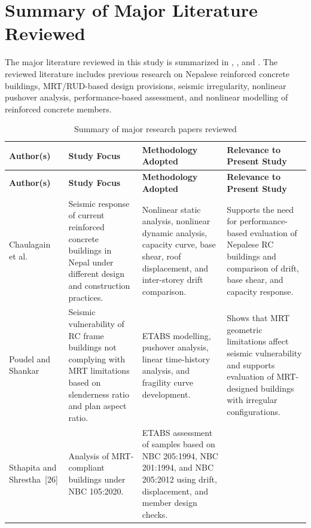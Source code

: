 \section{Summary of Major Literature Reviewed}
The major literature reviewed in this study is summarized in , , and . The reviewed literature includes previous research on Nepalese reinforced concrete buildings, MRT/RUD-based design provisions, seismic irregularity, nonlinear pushover analysis, performance-based assessment, and nonlinear modelling of reinforced concrete members.
\begingroup
\small
\setlength{\LTpre}{6pt}
\setlength{\LTpost}{6pt}
\begin{longtable}{@{}p{3.35cm}p{2.95cm}p{3.35cm}p{3.25cm}@{}}
\caption{Summary of major research papers reviewed}\label{tab:literature_research_papers}\\
\hline\hline
\textbf{Author(s)} & \textbf{Study Focus} & \textbf{Methodology Adopted} & \textbf{Relevance to Present Study} \\ \hline
\endfirsthead
\hline\hline
\textbf{Author(s)} & \textbf{Study Focus} & \textbf{Methodology Adopted} & \textbf{Relevance to Present Study} \\ \hline
\endhead
Chaulagain et al.\newline \cite{chaulagain2013seismic}
& Seismic response of current reinforced concrete buildings in Nepal under different design and construction practices.
& Nonlinear static analysis, nonlinear dynamic analysis, capacity curve, base shear, roof displacement, and inter-storey drift comparison.
& Supports the need for performance-based evaluation of Nepalese RC buildings and comparison of drift, base shear, and capacity response. \\ \hline
Poudel and Shankar\newline \cite{poudel2017seismic}
& Seismic vulnerability of RC frame buildings not complying with MRT limitations based on slenderness ratio and plan aspect ratio.
& ETABS modelling, pushover analysis, linear time-history analysis, and fragility curve development.
& Shows that MRT geometric limitations affect seismic vulnerability and supports evaluation of MRT-designed buildings with irregular configurations. \\ \hline
Sthapita and Shrestha~[26]
& Analysis of MRT-compliant buildings under NBC 105:2020.
& ETABS assessment of samples based on NBC 205:1994, NBC 201:1994, and NBC 205:2012 using drift, displacement, and member design checks.

\end{longtable}
